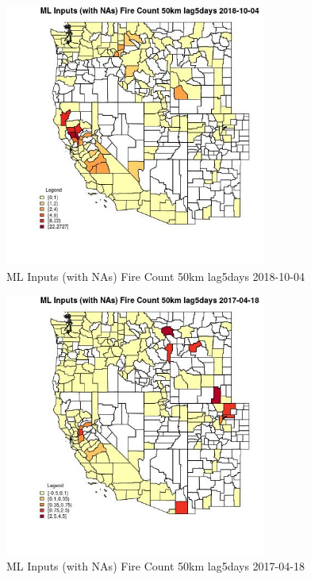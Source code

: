 \clearpage 

\begin{figure} 
\centering  
\includegraphics[width=0.77\textwidth]{Code_Outputs/Report_ML_input_PM25_Step4_part_f_de_duplicated_aveswNAs_CountyFire_Count_50km_lag5daysMean2018-10-04.jpg} 
\caption{\label{fig:Report_ML_input_PM25_Step4_part_f_de_duplicated_aveswNAsCountyFire_Count_50km_lag5daysMean2018-10-04}ML Inputs (with NAs) Fire Count 50km lag5days 2018-10-04} 
\end{figure} 
 

\begin{figure} 
\centering  
\includegraphics[width=0.77\textwidth]{Code_Outputs/Report_ML_input_PM25_Step4_part_f_de_duplicated_aveswNAs_CountyFire_Count_50km_lag5daysMean2017-04-18.jpg} 
\caption{\label{fig:Report_ML_input_PM25_Step4_part_f_de_duplicated_aveswNAsCountyFire_Count_50km_lag5daysMean2017-04-18}ML Inputs (with NAs) Fire Count 50km lag5days 2017-04-18} 
\end{figure} 
 

